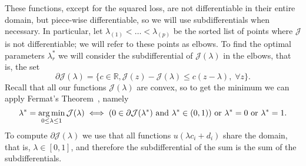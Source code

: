 %
These functions, except for the squared loss, are not differentiable in their entire domain, but piece-wise differentiable, so we will use subdifferentials when necessary.  In particular, let ${\lambda}_{(1)} < \ldots < {\lambda}_{(p)}$ be the sorted list of points where $\mathcal{J}$ is not differentiable; we will refer to these points as elbows.
To find the optimal parameters $\lambda_r^*$ we will consider the subdifferential of $\mathcal{J}(\lambda)$ in the elbows, that is, the set $$\partial \mathcal{J}(\lambda) = \{c \in \mathbb{R}, \mathcal{J}(z)-\mathcal{J}(\lambda) \leq c (z - \lambda), \;  \forall z \} .$$
%
Recall that all our functions $\mathcal{J}(\lambda)$ are convex, so to get the minimum we can apply Fermat's Theorem~\citep{BauschkeC11}, namely
\begin{equation}
    \nonumber
    \lambda^* = \operatorname*{arg\min}_{0 \leq \lambda \leq 1} \mathcal{J}(\lambda) \iff (0 \in \partial \mathcal{J}(\lambda^*) \text{ and } \lambda^* \in (0, 1) ) \text{ or } \lambda^*=0 \text{ or } \lambda^*=1 .
\end{equation}
To compute $\partial \mathcal{J}(\lambda)$ we use that all functions $u(\lambda c_i + d_i)$ share the domain, that is, $\lambda \in [0, 1]$, and therefore the subdifferential of the sum is the sum of the subdifferentials.
%


